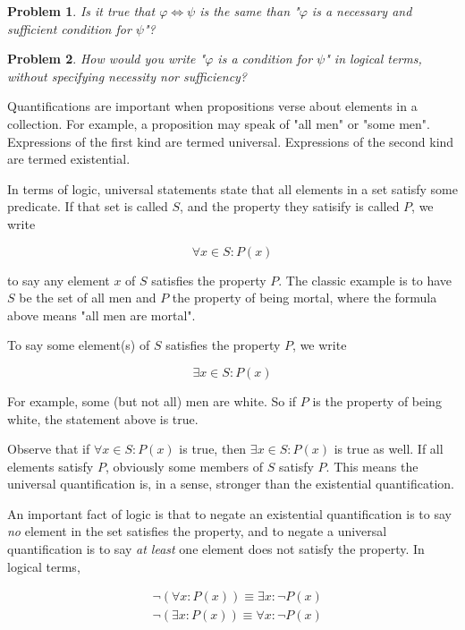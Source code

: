 \documentclass[a4paper, 12pt]{article}
\newtheorem{problem}{Problem}
\newtheorem{problem}{Problem}
\begin{document}
\begin{problem}
    Is it true that $\varphi \iff \psi$ is the same than "$\varphi$ is a necessary and sufficient 
    condition for $\psi$"?
\end{problem}

\begin{problem}
    How would you write "$\varphi$ is a condition for $\psi$" in logical terms, without specifying 
    necessity nor sufficiency?
\end{problem}

Quantifications are important when propositions verse about elements in a
collection. For example, a proposition may speak of "all men" or "some men".
Expressions of the first kind are termed universal. Expressions of the second
kind are termed existential. 

In terms of logic, universal statements state that all elements in a set satisfy 
some predicate. If that set is called $S$, and the property they satisify is called $P$,
we write 

\begin{equation*}
    \forall x \in S : P(x)
\end{equation*}

to say any element $x$ of $S$ satisfies the property $P$. The classic example is 
to have $S$ be the set of all men and $P$ the property of being mortal, where 
the formula above means "all men are mortal". 

To say some element(s) of $S$ satisfies the property $P$, we write 

\begin{equation*}
    \exists x \in S : P(x)
\end{equation*}

For example, some (but not all) men are white. So if $P$ is the property of 
being white, the statement above is true. 

Observe that if $\forall x \in S : P(x)$ is true, then $\exists x \in S : P(x)$
is true as well. If all elements satisfy $P$, obviously some members of $S$
satisfy $P$. This means the universal quantification is, in a sense, stronger
than the existential quantification.

An important fact of logic is that to negate an existential quantification is
to say \textit{no} element in the set satisfies the property, and to negate a
universal quantification is to say \textit{at least} one element does not
satisfy the property. In logical terms,

\begin{align*}
    &\neg \left( \forall x : P(x) \right) \equiv \exists x : \neg P(x) \\ 
    &\neg(\exists x : P(x)) \equiv \forall x : \neg P(x)
\end{align*}
\end{document}
